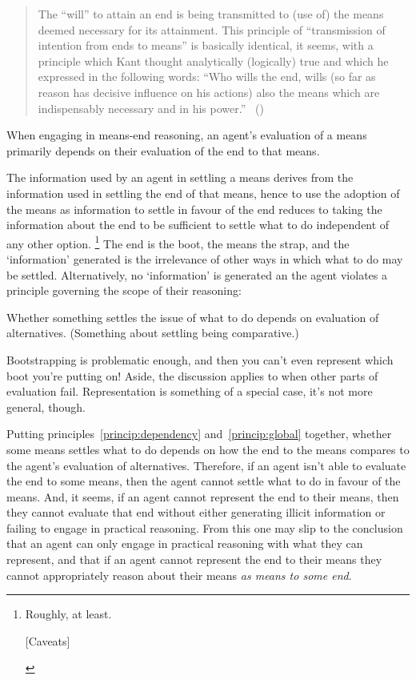 \documentclass[10pt]{article}
\begin{document}
{\begin{quote}
  The ``will'' to attain an end is being transmitted to (use of) the means deemed necessary for its attainment.
  This principle of ``transmission of intention from ends to means'' is basically identical, it seems, with a principle which Kant thought analytically (logically) true and which he expressed in the following words:
  ``Who wills the end, wills (so far as reason has decisive influence on his actions) also the means which are indispensably necessary and in his power.''\nolinebreak
  \mbox{ }\hfill(\cite[40]{Von-Wright:1972aa})
\end{quote}
}
\begin{principle}\label{princip:dependency}
  When engaging in means-end reasoning, an agent's evaluation of a means primarily depends on their evaluation of the end to that means.
\end{principle}
The information used by an agent in settling a means derives from the information used in settling the end of that means, hence to use the adoption of the means as information to settle in favour of the end reduces to taking the information about the end to be sufficient to settle what to do independent of any other option.\nolinebreak
\footnote{
  Roughly, at least.
  \begin{center}
    [Caveats]
  \end{center}
}
The end is the boot, the means the strap, and the `information' generated is the irrelevance of other ways in which what to do may be settled.
Alternatively, no `information' is generated an the agent violates a principle governing the scope of their reasoning:
\begin{principle}\label{princip:global}
  Whether something settles the issue of what to do depends on evaluation of alternatives.
  (Something about settling being comparative.)
\end{principle}

Bootstrapping is problematic enough, and then you can't even represent which boot you're putting on!
{\color{red} Aside, the discussion applies to when other parts of evaluation fail.
Representation is something of a special case, it's not more general, though.}

Putting principles~\ref{princip:dependency} and~\ref{princip:global} together, whether some means settles what to do depends on how the end to the means compares to the agent's evaluation of alternatives.
Therefore, if an agent isn't able to evaluate the end to some means, then the agent cannot settle what to do in favour of the means.
And, it seems, if an agent cannot represent the end to their means, then they cannot evaluate that end without either generating illicit information or failing to engage in practical reasoning.
From this one may slip to the conclusion that an agent can only engage in practical reasoning with what they can represent, and that if an agent cannot represent the end to their means they cannot appropriately reason about their means \emph{as means to some end}.
\end{document}
